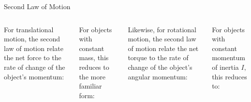\documentclass[12pt,compress,aspectratio=169]{beamer}
\begin{document}
%  
%
%
%
%
%
%
%  



\begin{frame}{Second Law of Motion}%
  \begin{columns}[T]
    For translational motion, the %
    second law of motion relate the net force to the rate of change of the
    object's momentum:


    For objects with constant mass, this reduces to the more familiar form:


    Likewise, for rotational motion, the second law of motion relate the net
    torque to the rate of change of the object's angular momentum:


    For objects with constant momentum of inertia $I$, this reduces to:
    
  \end{columns}
\end{frame}
\end{document}
